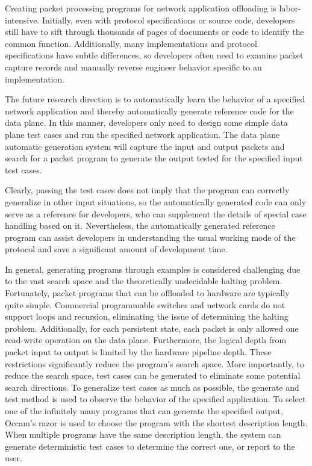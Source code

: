 Creating packet processing programs for network application offloading is labor-intensive. Initially, even with protocol specifications or source code, developers still have to sift through thousands of pages of documents or code to identify the common function. Additionally, many implementations and protocol specifications have subtle differences, so developers often need to examine packet capture records and manually reverse engineer behavior specific to an implementation.

The future research direction is to automatically learn the behavior of a specified network application and thereby automatically generate reference code for the data plane. In this manner, developers only need to design some simple data plane test cases and run the specified network application. The data plane automatic generation system will capture the input and output packets and search for a packet program to generate the output tested for the specified input test cases.

Clearly, passing the test cases does not imply that the program can correctly generalize in other input situations, so the automatically generated code can only serve as a reference for developers, who can supplement the details of special case handling based on it. Nevertheless, the automatically generated reference program can assist developers in understanding the usual working mode of the protocol and save a significant amount of development time.

In general, generating programs through examples is considered challenging due to the vast search space and the theoretically undecidable halting problem. Fortunately, packet programs that can be offloaded to hardware are typically quite simple. Commercial programmable switches and network cards do not support loops and recursion, eliminating the issue of determining the halting problem. Additionally, for each persistent state, each packet is only allowed one read-write operation on the data plane. Furthermore, the logical depth from packet input to output is limited by the hardware pipeline depth. These restrictions significantly reduce the program's search space.
More importantly, to reduce the search space, test cases can be generated to eliminate some potential search directions.
To generalize test cases as much as possible, the generate and test method is used to observe the behavior of the specified application. To select one of the infinitely many programs that can generate the specified output, Occam's razor is used to choose the program with the shortest description length. When multiple programs have the same description length, the system can generate deterministic test cases to determine the correct one, or report to the user.

